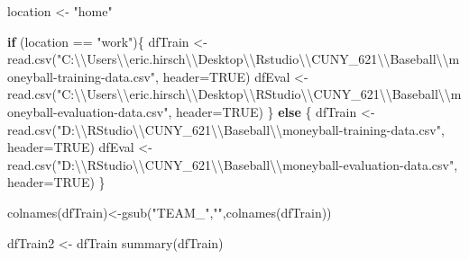 \documentclass[
]{article}
\newenvironment{Shaded}{\begin{snugshade}}{\end{snugshade}}
\newcommand{\AttributeTok}[1]{\textcolor[rgb]{0.77,0.63,0.00}{#1}}
\newcommand{\ConstantTok}[1]{\textcolor[rgb]{0.00,0.00,0.00}{#1}}
\newcommand{\ControlFlowTok}[1]{\textcolor[rgb]{0.13,0.29,0.53}{\textbf{#1}}}
\newcommand{\FunctionTok}[1]{\textcolor[rgb]{0.00,0.00,0.00}{#1}}
\newcommand{\NormalTok}[1]{#1}
\newcommand{\OtherTok}[1]{\textcolor[rgb]{0.56,0.35,0.01}{#1}}
\newcommand{\SpecialCharTok}[1]{\textcolor[rgb]{0.00,0.00,0.00}{#1}}
\newcommand{\StringTok}[1]{\textcolor[rgb]{0.31,0.60,0.02}{#1}}
\begin{document}
\begin{Shaded}
\begin{Highlighting}[]
\NormalTok{location }\OtherTok{\textless{}{-}} \StringTok{"home"}

\ControlFlowTok{if}\NormalTok{ (location }\SpecialCharTok{==} \StringTok{"work"}\NormalTok{)\{}
\NormalTok{dfTrain }\OtherTok{\textless{}{-}} \FunctionTok{read.csv}\NormalTok{(}\StringTok{"C:}\SpecialCharTok{\textbackslash{}\textbackslash{}}\StringTok{Users}\SpecialCharTok{\textbackslash{}\textbackslash{}}\StringTok{eric.hirsch}\SpecialCharTok{\textbackslash{}\textbackslash{}}\StringTok{Desktop}\SpecialCharTok{\textbackslash{}\textbackslash{}}\StringTok{Rstudio}\SpecialCharTok{\textbackslash{}\textbackslash{}}\StringTok{CUNY\_621}\SpecialCharTok{\textbackslash{}\textbackslash{}}\StringTok{Baseball}\SpecialCharTok{\textbackslash{}\textbackslash{}}\StringTok{moneyball{-}training{-}data.csv"}\NormalTok{, }\AttributeTok{header=}\ConstantTok{TRUE}\NormalTok{)}
\NormalTok{dfEval }\OtherTok{\textless{}{-}} \FunctionTok{read.csv}\NormalTok{(}\StringTok{"C:}\SpecialCharTok{\textbackslash{}\textbackslash{}}\StringTok{Users}\SpecialCharTok{\textbackslash{}\textbackslash{}}\StringTok{eric.hirsch}\SpecialCharTok{\textbackslash{}\textbackslash{}}\StringTok{Desktop}\SpecialCharTok{\textbackslash{}\textbackslash{}}\StringTok{RStudio}\SpecialCharTok{\textbackslash{}\textbackslash{}}\StringTok{CUNY\_621}\SpecialCharTok{\textbackslash{}\textbackslash{}}\StringTok{Baseball}\SpecialCharTok{\textbackslash{}\textbackslash{}}\StringTok{moneyball{-}evaluation{-}data.csv"}\NormalTok{, }\AttributeTok{header=}\ConstantTok{TRUE}\NormalTok{)}
\NormalTok{\} }\ControlFlowTok{else}
\NormalTok{\{}
\NormalTok{dfTrain }\OtherTok{\textless{}{-}} \FunctionTok{read.csv}\NormalTok{(}\StringTok{"D:}\SpecialCharTok{\textbackslash{}\textbackslash{}}\StringTok{RStudio}\SpecialCharTok{\textbackslash{}\textbackslash{}}\StringTok{CUNY\_621}\SpecialCharTok{\textbackslash{}\textbackslash{}}\StringTok{Baseball}\SpecialCharTok{\textbackslash{}\textbackslash{}}\StringTok{moneyball{-}training{-}data.csv"}\NormalTok{, }\AttributeTok{header=}\ConstantTok{TRUE}\NormalTok{)}
\NormalTok{dfEval }\OtherTok{\textless{}{-}} \FunctionTok{read.csv}\NormalTok{(}\StringTok{"D:}\SpecialCharTok{\textbackslash{}\textbackslash{}}\StringTok{RStudio}\SpecialCharTok{\textbackslash{}\textbackslash{}}\StringTok{CUNY\_621}\SpecialCharTok{\textbackslash{}\textbackslash{}}\StringTok{Baseball}\SpecialCharTok{\textbackslash{}\textbackslash{}}\StringTok{moneyball{-}evaluation{-}data.csv"}\NormalTok{, }\AttributeTok{header=}\ConstantTok{TRUE}\NormalTok{)}
\NormalTok{\}}

\FunctionTok{colnames}\NormalTok{(dfTrain)}\OtherTok{\textless{}{-}}\FunctionTok{gsub}\NormalTok{(}\StringTok{"TEAM\_"}\NormalTok{,}\StringTok{""}\NormalTok{,}\FunctionTok{colnames}\NormalTok{(dfTrain))}

\NormalTok{dfTrain2 }\OtherTok{\textless{}{-}}\NormalTok{ dfTrain}
\FunctionTok{summary}\NormalTok{(dfTrain)}
\end{Highlighting}
\end{Shaded}
\end{document}
